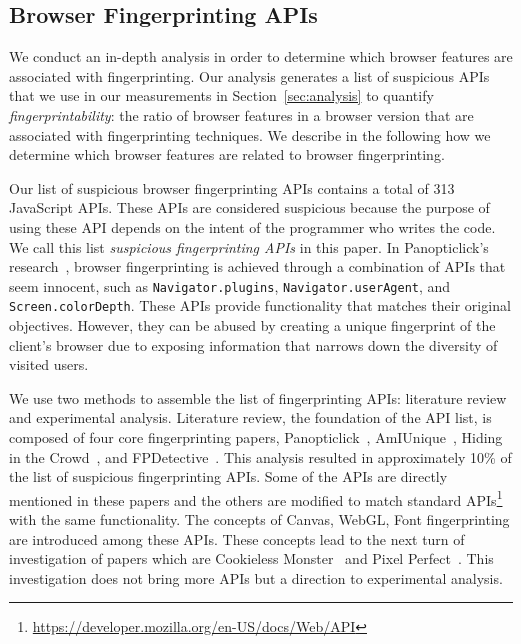 \subsection{Browser Fingerprinting APIs}
\label{sec:fp-apis}

We conduct an in-depth analysis in order to determine which browser features are associated with fingerprinting. Our analysis generates a list of suspicious APIs that we use in our measurements in Section~\ref{sec:analysis} to quantify \textit{fingerprintability}: the ratio of browser features in a browser version that are associated with fingerprinting techniques. We describe in the following how we determine which browser features are related to browser fingerprinting.

Our list of suspicious browser fingerprinting APIs contains a total of 313 JavaScript APIs. These APIs are considered suspicious because the purpose of using these API depends on the intent of the programmer who writes the code. 
We call this list \textit{suspicious fingerprinting APIs} in this paper.
In Panopticlick's research~\cite{panopticlick}, browser fingerprinting is achieved through a combination of APIs that seem innocent, such as \texttt{Navigator.plugins}, \texttt{Navigator.userAgent}, and \texttt{Screen.colorDepth}. These APIs provide functionality that matches their original objectives. However, they can be abused by creating a unique fingerprint of the client's browser due to exposing information that narrows down the diversity of visited users. %

We use two methods to assemble the list of fingerprinting APIs: literature review and experimental analysis. Literature review, the foundation of the API list, is composed of four core fingerprinting papers, Panopticlick~\cite{panopticlick}, AmIUnique~\cite{amiunique}, Hiding in the Crowd~\cite{hidinginthecrowd}, and FPDetective~\cite{fpdetective}. This analysis resulted in approximately 10\% of the list of suspicious fingerprinting APIs. Some of the APIs are directly mentioned in these papers and the others are modified to match standard APIs\footnote{\url{https://developer.mozilla.org/en-US/docs/Web/API}} with the same functionality. The concepts of Canvas, WebGL, Font fingerprinting are introduced among these APIs. These concepts lead to the next turn of investigation of papers which are Cookieless Monster~\cite{cookiemonster-SP13} and Pixel Perfect~\cite{mowery2012pixel}. This investigation does not bring more APIs but a direction to experimental analysis. 

